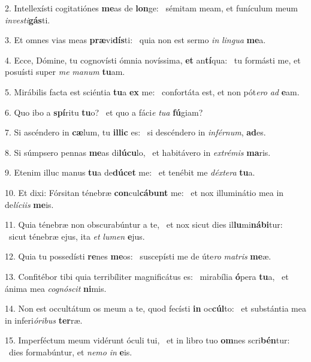2. Intellexísti cogitatiónes \textbf{me}as de \textbf{lon}ge: \ast\  sémitam meam, et funículum meum \textit{in}\textit{ves}\textit{ti}\textbf{gás}ti.\

3. Et omnes vias meas \textbf{præ}vi\textbf{dís}ti: \ast\  quia non est sermo \textit{in} \textit{lin}\textit{gua} \textbf{me}a.\

4. Ecce, Dómine, tu cognovísti ómnia novíssima, \textbf{et} an\textbf{tí}qua: \ast\  tu formásti me, et posuísti super \textit{me} \textit{ma}\textit{num} \textbf{tu}am.\

5. Mirábilis facta est sciéntia \textbf{tu}a \textbf{ex} me: \ast\  confortáta est, et non pót\textit{e}\textit{ro} \textit{ad} \textbf{e}am.\

6. Quo ibo a \textbf{spí}ritu \textbf{tu}o? \ast\  et quo a fáci\textit{e} \textit{tu}\textit{a} \textbf{fú}giam?\

7. Si ascéndero in \textbf{cæ}lum, tu \textbf{il}\textbf{lic} es: \ast\  si descéndero in \textit{in}\textit{fér}\textit{num}, \textbf{ad}es.\

8. Si súmpsero pennas \textbf{me}as di\textbf{lú}\textbf{cu}lo, \ast\  et habitávero in \textit{ex}\textit{tré}\textit{mis} \textbf{ma}ris.\

9. Etenim illuc manus \textbf{tu}a de\textbf{dú}\textbf{cet} me: \ast\  et tenébit me \textit{déx}\textit{te}\textit{ra} \textbf{tu}a.\

10. Et dixi: Fórsitan ténebræ \textbf{con}cul\textbf{cá}\textbf{bunt} me: \ast\  et nox illuminátio mea in de\textit{lí}\textit{ci}\textit{is} \textbf{me}is.\

11. Quia ténebræ non obscurabúntur a te, \dag\  et nox sicut dies il\textbf{lu}mi\textbf{ná}\textbf{bi}tur: \ast\  sicut ténebræ ejus, ita \textit{et} \textit{lu}\textit{men} \textbf{e}jus.\

12. Quia tu possedísti \textbf{re}nes \textbf{me}os: \ast\  suscepísti me de úte\textit{ro} \textit{ma}\textit{tris} \textbf{me}æ.\

13. Confitébor tibi quia terribíliter magnificátus es: \dag\  mirabília \textbf{ó}pera \textbf{tu}a, \ast\  et ánima mea \textit{co}\textit{gnó}\textit{scit} \textbf{ni}mis.\

14. Non est occultátum os meum a te, quod fecísti \textbf{in} oc\textbf{cúl}to: \ast\  et substántia mea in inferi\textit{ó}\textit{ri}\textit{bus} \textbf{ter}ræ.\

15. Imperféctum meum vidérunt óculi tui, \dag\  et in libro tuo \textbf{om}nes scri\textbf{bén}tur: \ast\  dies formabúntur, et \textit{ne}\textit{mo} \textit{in} \textbf{e}is.\

